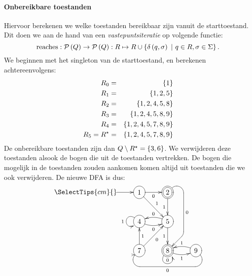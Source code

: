 \documentclass[a4paper]{article}
\begin{document}
\begin{question}
\begin{answer}
\paragraph{Onbereikbare toestanden}
Hiervoor berekenen we welke toestanden bereikbaar zijn vanuit de starttoestand. Dit doen we aan de hand van een \emph{vastepuntsiteratie} op volgende functie:
\begin{equation}
\mbox{reaches}:\mathcal{P}\left( Q \right)\rightarrow \mathcal{P}\left( Q \right):R\mapsto R\cup\left\{ \delta\left( q,\sigma \right)\ |\ q\in R,\sigma\in\Sigma \right\}.
\end{equation}
We beginnen met het singleton van de starttoestand, en berekenen achtereenvolgens:
\begin{eqnarray}
R_0&=&\left\{ 1 \right\}\\
R_1&=&\left\{ 1,2,5 \right\}\\
R_2&=&\left\{ 1,2,4,5,8 \right\}\\
R_3&=&\left\{ 1,2,4,5,8,9 \right\}\\
R_4&=&\left\{ 1,2,4,5,7,8,9 \right\}\\
R_5=R^{\star}&=&\left\{ 1,2,4,5,7,8,9 \right\}
\end{eqnarray}
De onbereikbare toestanden zijn dan $Q\setminus R^{\star}=\left\{ 3,6 \right\}$. We verwijderen deze toestanden alsook de bogen die uit de toestanden vertrekken. De bogen die mogelijk in de toestanden zouden aankomen komen altijd uit toestanden die we ook verwijderen. De nieuwe DFA is dus:
\[  \entrymodifiers={++[o][F-]}
  \SelectTips{cm}{}
  \xymatrix {
    *{}\ar[r] &1\ar[r]_0\ar[rd]^1           &*++[o][F=]{2}\ar[d]_1\ar `ur_r[dd]`[dd]`_dl[dd]^0[dd] &*[]{}\\
    *{}       &4\ar@(lu,ld)[]_1\ar@/_/[r]_0 &5\ar[d]_1\ar@/_/[l]_0                                 &*[]{}\\
    *{}       &7\ar[u]_1\ar[ru]_0           &*++[o][F=]{8}\ar@(ld,rd)[]^0\ar@/_/[r]_1              &9\ar@/_/[l]_1\ar`dr_l[ll]`_ur[ll]^0 [ll]\\
} \]
\end{answer}

\end{question}
\end{document}
